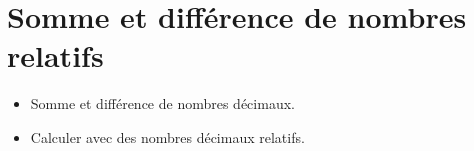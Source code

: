 \themaN
\graphicspath{{../../S20_Somme_et_difference_de_nombres_relatifs/Images/}}

\newcommand{\pyramidedenombres}[1]{
   \pgfmathparse{#1-1};
   \edef\yy{\pgfmathresult};
   \foreach \y in {0,1,...,\yy}{
      \pgfmathparse{\yy-\y};
      \edef\xx{\pgfmathresult};
      \foreach \x in {0,...,\xx}{
         \draw (\x+0.5*\y,1+\y) rectangle (\x+1+0.5*\y,0+\y);}};}

\newcommand{\pyramideplacernombre}[3]{
   \pgfmathparse{0.5*#1+#2-1};
   \edef\xx{\pgfmathresult};
   \pgfmathparse{#1-0.5};
   \edef\yy{\pgfmathresult};
   \draw (\xx,\yy) node {$#3$};}

\newcommand\encercle[1]{%
   \unitlength1em
   \begin{picture}(2,2)
      \put(0.75,0.3){\circle{3}}
      \put(0,0){\parbox[b]{1.5em}{\centering#1}}
   \end{picture}}
   
\chapter{Somme et différence de nombres relatifs}
\label{S20}


\begin{prerequis}
   \begin{itemize}
      \item Somme et différence de nombres décimaux.
      \item[\com] Calculer avec des nombres décimaux relatifs.
   \end{itemize}
\end{prerequis}

\vfill

